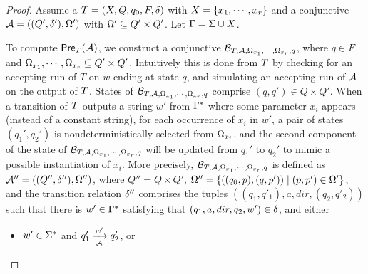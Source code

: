 \begin{proof}
Assume a \PPT{} $T=(X, Q, q_0, F, \delta)$ with $X = \{x_1,\cdots, x_r\}$ and a conjunctive \FA{} $\mathcal{A} = ((Q', \delta'), \Omega')$ with $\Omega' \subseteq Q' \times Q'$. %
Let $\Gamma = \Sigma \cup X$.

To compute $\textsf{Pre}_{T}(\mathcal{A})$, we construct a conjunctive \FFA{} %
$\mathcal{B}_{T, \mathcal{A}, \Omega_{x_1}, \cdots, \Omega_{x_r}, q}$, %
%
where  $q \in F$ and  $\Omega_{x_1}, \cdots, \Omega_{x_r} \subseteq Q' \times Q'$.   
Intuitively this is done from $T$  by checking for an accepting run of $T$ on $w$ ending at state $q$, and simulating an accepting run of $\mathcal{A}$ on the output of $T$. States of $\mathcal{B}_{T, \mathcal{A}, \Omega_{x_1}, \cdots, \Omega_{x_r}, q}$ comprise $(q,q') \in Q \times Q'$. 
When a transition of $T$ outputs a string $w'$ from $\Gamma^*$ where some parameter $x_i$ appears (instead of a constant string), for each occurrence of $x_i$ in $w'$, a pair of states $(q_1', q_2')$ is nondeterministically selected from $\Omega_{x_i}$, and the second component of the state of $\mathcal{B}_{T, \mathcal{A}, \Omega_{x_1}, \cdots, \Omega_{x_r}, q}$ will be updated from $q_1'$ to $q_2'$ to mimic a possible instantiation of $x_i$.  
More precisely, $\mathcal{B}_{T, \mathcal{A}, \Omega_{x_1}, \cdots, \Omega_{x_r}, q}$ is defined as
$\mathcal{A}'' = ((Q'', \delta''), \Omega'')$, where $Q'' = Q \times Q'$, $\Omega'' = \{((q_0, p), (q, p')) \mid (p, p') \in \Omega'\}$, and the transition relation $\delta''$ comprises the tuples $((q_1, q'_1), a, dir, (q_2, q'_2))$ such that there is $w' \in \Gamma^*$ satisfying that $(q_1, a, dir, q_2, w') \in \delta$, and either
\begin{itemize}
\item $w' \in \Sigma^*$  and $q'_1 \xrightarrow[\mathcal{A}]{w'} q'_2$, or

\end{itemize}
\end{proof}
